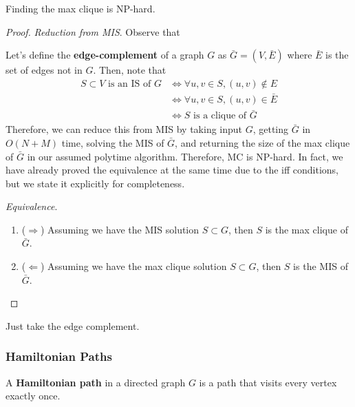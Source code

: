     \begin{theorem}[MC]
      Finding the max clique is NP-hard. 
    \end{theorem}
    \begin{proof}
      \textit{Reduction from MIS}. Observe that 

      Let's define the \textbf{edge-complement} of a graph $G$ as $\bar{G} = (V, \bar{E})$ where $\bar{E}$ is the set of edges not in $G$. Then, note that 
      \begin{align}
        S \subset V \text{ is an IS of } G & \iff \forall u, v \in S, (u, v) \not\in E  \\
                                           & \iff \forall u, v \in S, (u, v) \in \bar{E} \\
                                           & \iff S \text{ is a clique of } \bar{G} 
      \end{align}
      Therefore, we can reduce this from MIS by taking input $G$, getting $\bar{G}$ in $O(N + M)$ time, solving the MIS of $\bar{G}$, and returning the size of the max clique of $\bar{G}$ in our assumed polytime algorithm. Therefore, MC is NP-hard. In fact, we have already proved the equivalence at the same time due to the iff conditions, but we state it explicitly for completeness. 

      \textit{Equivalence}. 
      \begin{enumerate}
        \item ($\Rightarrow$) Assuming we have the MIS solution $S \subset G$, then $S$ is the max clique of $\bar{G}$. 
        \item ($\Leftarrow$) Assuming we have the max clique solution $S \subset G$, then $S$ is the MIS of $\bar{G}$. 
      \end{enumerate}
    \end{proof}

    \begin{example}
      Just take the edge complement. 
    \end{example}

  \subsubsection{Hamiltonian Paths} 

    \begin{definition}
      A \textbf{Hamiltonian path} in a directed graph $G$ is a path that visits every vertex exactly once. 
    \end{definition} 

